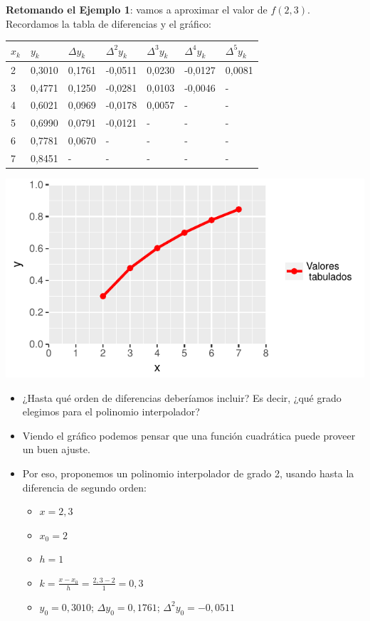 \documentclass[openany]{book}
\providecommand{\tightlist}{%
  \setlength{\itemsep}{0pt}\setlength{\parskip}{0pt}}
\begin{document}
\textbf{Retomando el Ejemplo 1}: vamos a aproximar el valor de \(f(2,3)\). Recordamos la tabla de diferencias y el gráfico:

\begin{longtable}[]{@{}lllllll@{}}
\toprule
\(x_k\) & \(y_k\) & \(\Delta y_k\) & \(\Delta^2 y_k\) & \(\Delta^3 y_k\) & \(\Delta^4 y_k\) & \(\Delta^5 y_k\)\tabularnewline
\midrule
\endhead
2 & 0,3010 & 0,1761 & -0,0511 & 0,0230 & -0,0127 & 0,0081\tabularnewline
3 & 0,4771 & 0,1250 & -0,0281 & 0,0103 & -0,0046 & -\tabularnewline
4 & 0,6021 & 0,0969 & -0,0178 & 0,0057 & - & -\tabularnewline
5 & 0,6990 & 0,0791 & -0,0121 & - & - & -\tabularnewline
6 & 0,7781 & 0,0670 & - & - & - & -\tabularnewline
7 & 0,8451 & - & - & - & - & -\tabularnewline
\bottomrule
\end{longtable}

\begin{center}\includegraphics[width=1\linewidth]{Plots/U4/Unidad4_g1} \end{center}

\begin{itemize}
\item
  ¿Hasta qué orden de diferencias deberíamos incluir? Es decir, ¿qué grado elegimos para el polinomio interpolador?
\item
  Viendo el gráfico podemos pensar que una función cuadrática puede proveer un buen ajuste.
\item
  Por eso, proponemos un polinomio interpolador de grado 2, usando hasta la diferencia de segundo orden:

  \begin{itemize}
  \tightlist
  \item
    \(x = 2,3\)
  \item
    \(x_0 = 2\)
  \item
    \(h = 1\)
  \item
    \(k = \frac{x-x_0}{h} = \frac{2,3-2}{1} = 0,3\)
  \item
    \(y_0 = 0,3010\); \(\Delta y_0 = 0,1761\); \(\Delta^2 y_0 = -0,0511\)
  \end{itemize}
\end{itemize}
\end{document}
